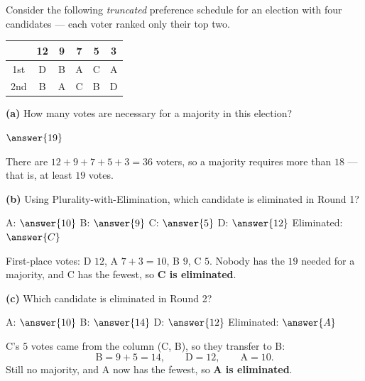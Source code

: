 \documentclass[12pt]{ximera}
\begin{document}
\begin{problem}
Consider the following \emph{truncated} preference schedule for an election with four
candidates --- each voter ranked only their top two.

\begin{center}
\begin{tabular}{c|ccccc}
 & 12 & 9 & 7 & 5 & 3\\\hline
1st & D & B & A & C & A \\
2nd & B & A & C & B & D \\
\end{tabular}
\end{center}

\begin{prompt}
\textbf{(a)} How many votes are necessary for a majority in this election?

$\answer{19}$

\begin{feedback}
There are $12+9+7+5+3 = 36$ voters, so a majority requires more than $18$ --- that is,
at least $19$ votes.
\end{feedback}
\end{prompt}

\begin{prompt}
\textbf{(b)} Using Plurality-with-Elimination, which candidate is eliminated in
Round 1?

A: $\answer{10}$ \quad B: $\answer{9}$ \quad C: $\answer{5}$ \quad D: $\answer{12}$
\qquad Eliminated: $\answer{C}$

\begin{feedback}
First-place votes: D $12$, A $7+3 = 10$, B $9$, C $5$. Nobody has the $19$ needed for a
majority, and C has the fewest, so \textbf{C is eliminated}.
\end{feedback}
\end{prompt}

\begin{prompt}
\textbf{(c)} Which candidate is eliminated in Round 2?

A: $\answer{10}$ \quad B: $\answer{14}$ \quad D: $\answer{12}$ \qquad
Eliminated: $\answer{A}$

\begin{feedback}
C's $5$ votes came from the column (C, B), so they transfer to B:
\[ \text{B} = 9+5 = 14, \qquad \text{D} = 12, \qquad \text{A} = 10. \]
Still no majority, and A now has the fewest, so \textbf{A is eliminated}.
\end{feedback}
\end{prompt}


\end{problem}
\end{document}
